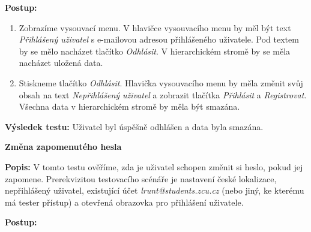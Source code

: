 \documentclass[czech, bc, kiv, he, iso690numb]{fasthesis}
\begin{document}
\noindent \textbf{Postup:}

\begin{enumerate}[label=\arabic*., itemsep=0pt, topsep=0pt, parsep=0pt]
    \item Zobrazíme vysouvací menu. V hlavičce vysouvacího menu by měl být text \textit{Přihlášený uživatel} s e-mailovou adresou přihlášeného uživatele. Pod textem by se mělo nacházet tlačítko \textit{Odhlásit}. V hierarchickém stromě by se měla nacházet uložená data.
    \item Stiskneme tlačítko \textit{Odhlásit}. Hlavička vysouvacího menu by měla změnit svůj obsah na text \textit{Nepřihlášený uživatel} a zobrazit tlačítka \textit{Přihlásit} a \textit{Registrovat}. Všechna data v hierarchickém stromě by měla být smazána.
\end{enumerate}

\noindent \textbf{Výsledek testu:} Uživatel byl úspěšně odhlášen a data byla smazána.

\vspace{0.1cm}


\noindent \textbf{Změna zapomenutého hesla}

\vspace{0.1cm}

\noindent \textbf{Popis:} V tomto testu ověříme, zda je uživatel schopen změnit si heslo, pokud jej zapomene. Prerekvizitou testovacího scénáře je nastavení české lokalizace, nepřihlášený uživatel, existující účet \textit{lrunt@students.zcu.cz} (nebo jiný, ke kterému má tester přístup) a otevřená obrazovka pro přihlášení uživatele.

\vspace{0.1cm}

\noindent \textbf{Postup:}
\end{document}
